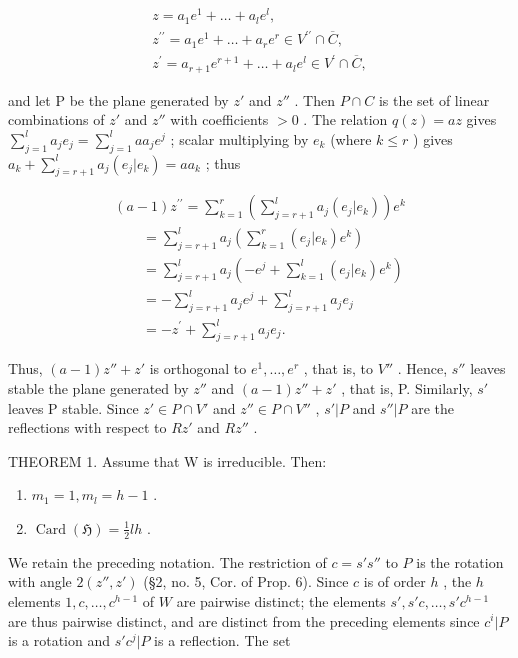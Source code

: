 \[
\begin{array}{r} z = a _ {1} e ^ {1} + \dots + a _ {l} e ^ {l}, \\ z ^ {\prime \prime} = a _ {1} e ^ {1} + \dots + a _ {r} e ^ {r} \in V ^ {\prime \prime} \cap \overline {{C}}, \\ z ^ {\prime} = a _ {r + 1} e ^ {r + 1} + \dots + a _ {l} e ^ {l} \in V ^ {\prime} \cap \overline {{C}}, \end{array}
\]

and let P be the plane generated by \(z'\) and \(z''\) . Then \(P \cap C\) is the set of linear combinations of \(z'\) and \(z''\) with coefficients \(> 0\) . The relation \(q(z) = az\) gives \(\sum_{j=1}^{l} a_j e_j = \sum_{j=1}^{l} aa_j e^j\) ; scalar multiplying by \(e_k\) (where \(k \leqslant r\) ) gives \(a_k + \sum_{j=r+1}^{l} a_j (e_j | e_k) = aa_k\) ; thus

\[
\begin{array}{l} (a - 1) z ^ {\prime \prime} = \sum_ {k = 1} ^ {r} \left(\sum_ {j = r + 1} ^ {l} a _ {j} (e _ {j} | e _ {k})\right) e ^ {k} \\ \qquad = \sum_ {j = r + 1} ^ {l} a _ {j} \left(\sum_ {k = 1} ^ {r} (e _ {j} | e _ {k}) e ^ {k}\right) \\ \qquad = \sum_ {j = r + 1} ^ {l} a _ {j} \left(- e ^ {j} + \sum_ {k = 1} ^ {l} (e _ {j} | e _ {k}) e ^ {k}\right) \\ \qquad = - \sum_ {j = r + 1} ^ {l} a _ {j} e ^ {j} + \sum_ {j = r + 1} ^ {l} a _ {j} e _ {j} \\ \qquad = - z ^ {\prime} + \sum_ {j = r + 1} ^ {l} a _ {j} e _ {j}. \end{array}
\]

Thus, \((a-1)z'' + z'\) is orthogonal to \(e^{1}, \ldots, e^{r}\) , that is, to \(V''\) . Hence, \(s''\) leaves stable the plane generated by \(z''\) and \((a-1)z'' + z'\) , that is, P. Similarly, \(s'\) leaves P stable. Since \(z' \in P \cap V'\) and \(z'' \in P \cap V''\) , \(s'|P\) and \(s''|P\) are the reflections with respect to \(Rz'\) and \(Rz''\) .

THEOREM 1. Assume that W is irreducible. Then:

\begin{enumerate}
\def\labelenumi{(\roman{enumi})}
\item
  \(m_{1} = 1, m_{l} = h - 1\) .
\item
  \(\operatorname{Card}(\mathfrak{H}) = \frac{1}{2} lh\) .
\end{enumerate}

We retain the preceding notation. The restriction of \(c = s's''\) to \(P\) is the rotation with angle \(2(z'', z')\) (§2, no. 5, Cor. of Prop. 6). Since \(c\) is of order \(h\) , the \(h\) elements \(1, c, \ldots, c^{h-1}\) of \(W\) are pairwise distinct; the elements \(s', s'c, \ldots, s'c^{h-1}\) are thus pairwise distinct, and are distinct from the preceding elements since \(c^i |P\) is a rotation and \(s'c^j |P\) is a reflection. The set

